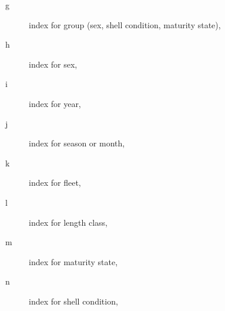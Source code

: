 \begin{description}
	\item [g] index for group (sex, shell condition, maturity state),
	\item [h] index for sex,
	\item [i] index for year,
	\item [j] index for season or month,
	\item [k] index for fleet,
	\item [l] index for length class,
	\item [m] index for maturity state,
	\item [n] index for shell condition,
\end{description}

